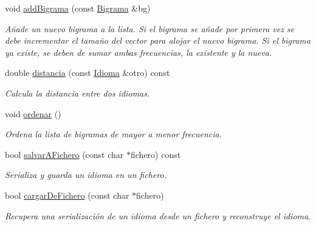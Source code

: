 \begin{DoxyCompactItemize}
void \hyperlink{classIdioma_af43adb93961472c23da23d841c198c1a}{add\+Bigrama} (const \hyperlink{classBigrama}{Bigrama} \&bg)
\begin{DoxyCompactList}\small\item\em Añade un nuevo bigrama a la lista. Si el bigrama se añade por primera vez se debe incrementar el tamaño del vector para alojar el nuevo bigrama. Si el bigrama ya existe, se deben de sumar ambas frecuencias, la existente y la nueva. \end{DoxyCompactList}\item 
double \hyperlink{classIdioma_a6c2901fbfd2f7ee7dead028dac45b44b}{distancia} (const \hyperlink{classIdioma}{Idioma} \&otro) const
\begin{DoxyCompactList}\small\item\em Calcula la distancia entre dos idiomas. \end{DoxyCompactList}\item 
\mbox{\label{classIdioma_aa6de3b18f24c765ca94f2e84a6498d66}} 
void \hyperlink{classIdioma_aa6de3b18f24c765ca94f2e84a6498d66}{ordenar} ()
\begin{DoxyCompactList}\small\item\em Ordena la lista de bigramas de mayor a menor frecuencia. \end{DoxyCompactList}\item 
bool \hyperlink{classIdioma_af49108ec99fd517ed7252158859c1b96}{salvar\+A\+Fichero} (const char $\ast$fichero) const
\begin{DoxyCompactList}\small\item\em Serializa y guarda un idioma en un fichero. \end{DoxyCompactList}\item 
bool \hyperlink{classIdioma_ab012e232b14198714f83372f43bf1eae}{cargar\+De\+Fichero} (const char $\ast$fichero)
\begin{DoxyCompactList}\small\item\em Recupera una serialización de un idioma desde un fichero y reconstruye el idioma. \end{DoxyCompactList}\end{DoxyCompactItemize}
